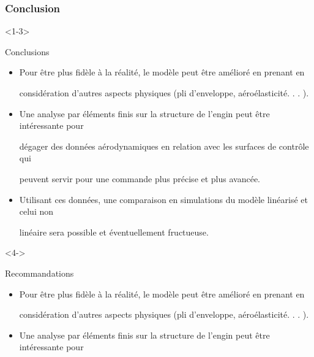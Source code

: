 \documentclass[xcolor=table]{beamer}
\begin{document}
\begin{frame}
  \frametitle{Conclusion}

\begin{onlyenv}<1-3>
     \begin{block}{Conclusions}
    \begin{itemize}[<+->]
    \item Pour être plus fidèle à la réalité, le modèle peut être amélioré en prenant en

    \vspace{0.15cm}
    considération d’autres aspects physiques (pli d’enveloppe, aéroélasticité. . . ).

    \vspace{0.15cm}
    \item Une analyse par éléments finis sur la structure de l’engin peut être intéressante pour

    \vspace{0.15cm}
    dégager des données aérodynamiques en relation avec les surfaces de contrôle qui

    \vspace{0.15cm}
    peuvent servir pour une commande plus précise et plus avancée.

    \vspace{0.15cm}
    \item Utilisant ces données, une comparaison en simulations du modèle linéarisé et celui non

    \vspace{0.15cm}
    linéaire sera possible et éventuellement fructueuse.
    \end{itemize}
  \end{block}
\end{onlyenv}

\begin{onlyenv}<4->
   \begin{block}{Recommandations}
    \begin{itemize}[<+->]
    \item Pour être plus fidèle à la réalité, le modèle peut être amélioré en prenant en

    \vspace{0.15cm}
    considération d’autres aspects physiques (pli d’enveloppe, aéroélasticité. . . ).

    \vspace{0.15cm}
    \item Une analyse par éléments finis sur la structure de l’engin peut être intéressante pour


\end{itemize}
\end{block}
\end{onlyenv}
\end{frame}
\end{document}
